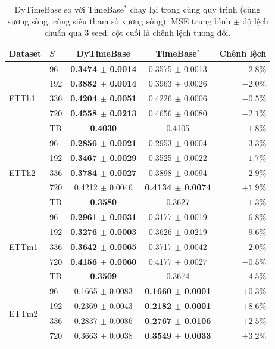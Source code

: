 \begin{table}[H]
\centering
\caption{DyTimeBase so với TimeBase$^{*}$ chạy lại trong cùng quy trình (cùng xương sống, cùng siêu tham số xương sống). MSE trung bình $\pm$ độ lệch chuẩn qua 3 seed; cột cuối là chênh lệch tương đối.}
\label{tab:vs-timebase}
\small
\begin{tabular}{@{}llccr@{}}
\toprule
Dataset & $S$ & DyTimeBase & TimeBase$^{*}$ & Chênh lệch\\
\midrule
\multirow{5}{*}{ETTh1} & 96 & \textbf{0.3474 $\pm$ 0.0014} & 0.3575 $\pm$ 0.0013 & $-2.8\%$\\
 & 192 & \textbf{0.3882 $\pm$ 0.0014} & 0.3963 $\pm$ 0.0026 & $-2.0\%$\\
 & 336 & \textbf{0.4204 $\pm$ 0.0051} & 0.4226 $\pm$ 0.0006 & $-0.5\%$\\
 & 720 & \textbf{0.4558 $\pm$ 0.0213} & 0.4656 $\pm$ 0.0080 & $-2.1\%$\\
 & TB & \textbf{0.4030} & 0.4105 & $-1.8\%$\\
\midrule
\multirow{5}{*}{ETTh2} & 96 & \textbf{0.2856 $\pm$ 0.0021} & 0.2953 $\pm$ 0.0004 & $-3.3\%$\\
 & 192 & \textbf{0.3467 $\pm$ 0.0029} & 0.3525 $\pm$ 0.0022 & $-1.7\%$\\
 & 336 & \textbf{0.3784 $\pm$ 0.0027} & 0.3898 $\pm$ 0.0094 & $-2.9\%$\\
 & 720 & 0.4212 $\pm$ 0.0046 & \textbf{0.4134 $\pm$ 0.0074} & $+1.9\%$\\
 & TB & \textbf{0.3580} & 0.3627 & $-1.3\%$\\
\midrule
\multirow{5}{*}{ETTm1} & 96 & \textbf{0.2961 $\pm$ 0.0031} & 0.3177 $\pm$ 0.0019 & $-6.8\%$\\
 & 192 & \textbf{0.3276 $\pm$ 0.0003} & 0.3626 $\pm$ 0.0219 & $-9.6\%$\\
 & 336 & \textbf{0.3642 $\pm$ 0.0065} & 0.3717 $\pm$ 0.0042 & $-2.0\%$\\
 & 720 & \textbf{0.4156 $\pm$ 0.0060} & 0.4177 $\pm$ 0.0027 & $-0.5\%$\\
 & TB & \textbf{0.3509} & 0.3674 & $-4.5\%$\\
\midrule
\multirow{5}{*}{ETTm2} & 96 & 0.1665 $\pm$ 0.0083 & \textbf{0.1660 $\pm$ 0.0001} & $+0.3\%$\\
 & 192 & 0.2369 $\pm$ 0.0043 & \textbf{0.2182 $\pm$ 0.0001} & $+8.6\%$\\
 & 336 & 0.2837 $\pm$ 0.0086 & \textbf{0.2767 $\pm$ 0.0106} & $+2.5\%$\\
 & 720 & 0.3663 $\pm$ 0.0038 & \textbf{0.3549 $\pm$ 0.0033} & $+3.2\%$\\

\end{tabular}
\end{table}
